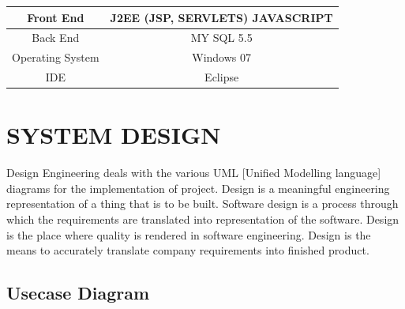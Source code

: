 \documentclass[BTech]{srmuthesis}
\begin{document}
\begingroup
\centering
\begin{tabular}{|c|c|}
\hline
Front End & J2EE (JSP, SERVLETS) JAVASCRIPT\\
\hline
Back End & MY SQL 5.5 \\
\hline
Operating System & Windows 07\\
\hline
IDE & Eclipse\\
\hline
\end{tabular}
\label{tbl:table1}
\endgroup

\chapter{SYSTEM DESIGN}
Design Engineering deals with the various UML [Unified Modelling language] diagrams for the implementation of project. Design is a meaningful engineering representation of a thing that is to be built. Software design is a process through which the requirements are translated into representation of the software. Design is the place where quality is rendered in software engineering. Design is the means to accurately translate company requirements into finished product.
\section{Usecase Diagram}
\end{document}
